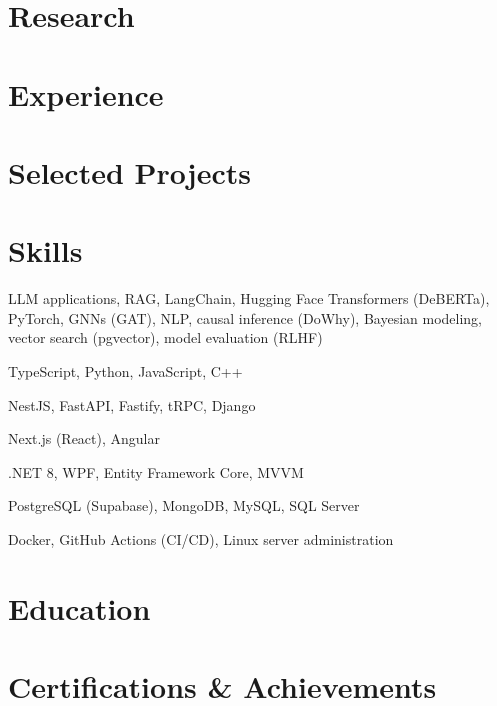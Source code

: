 \documentclass[10pt, a4paper]{article}
\begin{document}
\section{Research}


\section{Experience}




\section{Selected Projects}



\section{Skills}
\begin{description}[style=unboxed, leftmargin=0pt, itemsep=0.2ex]
    \item[AI/ML:] LLM applications, RAG, LangChain, Hugging Face Transformers (DeBERTa), PyTorch, GNNs (GAT), NLP, causal inference (DoWhy), Bayesian modeling, vector search (pgvector), model evaluation (RLHF)
    \item[Languages:] TypeScript, Python, JavaScript, C++
    \item[Backend:] NestJS, FastAPI, Fastify, tRPC, Django
    \item[Frontend:] Next.js (React), Angular
    \item[.NET:] .NET 8, WPF, Entity Framework Core, MVVM
    \item[Databases:] PostgreSQL (Supabase), MongoDB, MySQL, SQL Server
    \item[DevOps:] Docker, GitHub Actions (CI/CD), Linux server administration
\end{description}

\section{Education}
\def\eduthesisline{}
\def\educoursework{}


\section{Certifications \& Achievements}
\def\certindustry{}


\end{document}
